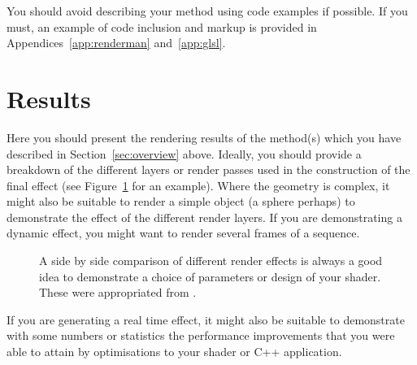 \documentclass[]{acmsiggraph}
\begin{document}
You should avoid describing your method using code examples if possible. If you must, an example of code inclusion and markup is provided in Appendices~\ref{app:renderman} and~\ref{app:glsl}.

\section{Results} \label{sec:results}
Here you should present the rendering results of the method(s) which you have described in Section~\ref{sec:overview} above. Ideally, you should provide a breakdown of the different layers or render passes used in the construction of the final effect (see Figure~\ref{fig:comparison} for an example). Where the geometry is complex, it might also be suitable to render a simple object (a sphere perhaps) to demonstrate the effect of the different render layers. If you are demonstrating a dynamic effect, you might want to render several frames of a sequence.

\begin{figure}[htbp]
  \centering
 \hfill
 \caption{\label{fig:comparison}A side by side comparison of different render effects is always a good idea to demonstrate a choice of parameters or design of your shader. These were appropriated from \protect\cite{renderman16}.}
\end{figure}

If you are generating a real time effect, it might also be suitable to demonstrate with some numbers or statistics the performance improvements that you were able to attain by optimisations to your shader or C++ application.
\end{document}
